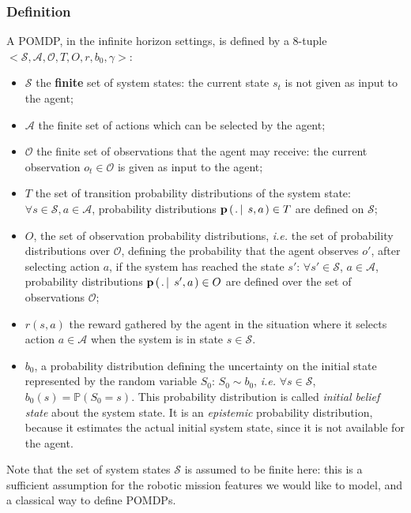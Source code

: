 \subsubsection{Definition}
\label{section_definition_POMDP}
A POMDP, in the infinite horizon settings,
is defined by a $8$-tuple $<\mathcal{S},\mathcal{A},\mathcal{O},T,O,r,b_0, \gamma>$:
\begin{itemize}
\item $\mathcal{S}$ 
the \textbf{finite} set of system states: the current state $s_t$
is not given as input to the agent;
\item $\mathcal{A}$ the finite set of actions 
which can be selected by the agent;
\item $\mathcal{O}$ the finite set of observations
that the agent may receive: the current observation $o_t \in \mathcal{O}$
is given as input to the agent;
\item $T$ the set of transition probability distributions
of the system state: $ \forall s \in \mathcal{S}, a \in \mathcal{A}$, 
probability distributions $\textbf{p} \left( \left.  . \, \right| \left. \, s,a \right. \right) \in T $ 
are defined on $\mathcal{S}$;
\item $O$, the set of observation probability distributions,
\textit{i.e.} the set of probability distributions over $\mathcal{O}$, 
defining the probability that the agent observes $o'$,
after selecting action $a$, 
if the system has reached the state $s'$:
$\forall s' \in \mathcal{S}$, $a \in \mathcal{A}$, 
probability distributions $\textbf{p} \left( \left.  . \, \right| \left. \, s',a  \right. \right) \in O $
are defined over the set of observations $\mathcal{O}$;
\item $r(s,a)$
the reward gathered by the agent
in the situation where it selects action $a \in \mathcal{A}$ 
when the system is in state $s\in\mathcal{S}$. 
\item $b_0$, a probability distribution 
defining the uncertainty on the initial state
represented by the random variable $S_0$: 
$S_0 \sim b_0$, \textit{i.e.}
$\forall s \in \mathcal{S}$, $b_0(s) = \mathbb{P}(S_0 = s)$. 
This probability distribution 
is called \textit{initial belief state} about the system state. 
It is an \textit{epistemic} probability distribution, 
because it estimates the actual initial system state,
since it is not available for the agent.
\end{itemize}
Note that the set of system states $\mathcal{S}$ 
is assumed to be finite here:
this is a sufficient assumption for the robotic mission features
we would like to model,
and a classical way to define POMDPs.
